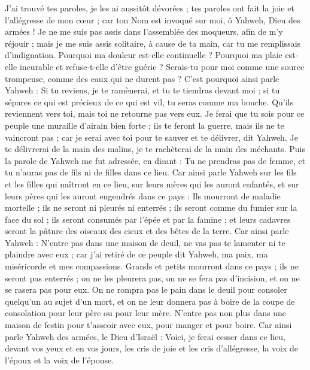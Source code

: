 \begin{multicols}{2}
J'ai trouvé tes paroles, je les ai aussitôt dévorées ; tes paroles ont fait la joie et l'allégresse de mon cœur ; car ton Nom est invoqué sur moi, ô Yahweh, Dieu des armées !
Je ne me suis pas assis dans l'assemblée des moqueurs, afin de m'y réjouir ; mais je me suis assis solitaire, à cause de ta main, car tu me remplissais d'indignation.
Pourquoi ma douleur est-elle continuelle ? Pourquoi ma plaie est-elle incurable et refuse-t-elle d'être guérie ? Serais-tu pour moi comme une source trompeuse, comme des eaux qui ne durent pas ?
C'est pourquoi ainsi parle Yahweh : Si tu reviens, je te ramènerai, et tu te tiendras devant moi ; si tu sépares ce qui est précieux de ce qui est vil, tu seras comme ma bouche. Qu'ils reviennent vers toi, mais toi ne retourne pas vers eux.
Je ferai que tu sois pour ce peuple une muraille d'airain bien forte ; ils te feront la guerre, mais ils ne te vaincront pas ; car je serai avec toi pour te sauver et te délivrer, dit Yahweh.
Je te délivrerai de la main des malins, je te rachèterai de la main des méchants.
\VerseOne{}Puis la parole de Yahweh me fut adressée, en disant :
Tu ne prendras pas de femme, et tu n'auras pas de fils ni de filles dans ce lieu.
Car ainsi parle Yahweh sur les fils et les filles qui naîtront en ce lieu, sur leurs mères qui les auront enfantés, et sur leurs pères qui les auront engendrés dans ce pays :
Ils mourront de maladie mortelle ; ils ne seront ni pleurés ni enterrés ; ils seront comme du fumier sur la face du sol ; ils seront consumés par l'épée et par la famine ; et leurs cadavres seront la pâture des oiseaux des cieux et des bêtes de la terre.
Car ainsi parle Yahweh : N'entre pas dans une maison de deuil, ne vas pas te lamenter ni te plaindre avec eux ; car j'ai retiré de ce peuple dit Yahweh, ma paix, ma miséricorde et mes compassions.
Grands et petits mourront dans ce pays ; ils ne seront pas enterrés ; on ne les pleurera pas, on ne se fera pas d'incision, et on ne se rasera pas pour eux.
On ne rompra pas le pain dans le deuil pour consoler quelqu'un au sujet d'un mort, et on ne leur donnera pas à boire de la coupe de consolation pour leur père ou pour leur mère.
N'entre pas non plus dans une maison de festin pour t'asseoir avec eux, pour manger et pour boire.
Car ainsi parle Yahweh des armées, le Dieu d'Israël : Voici, je ferai cesser dans ce lieu, devant vos yeux et en vos jours, les cris de joie et les cris d'allégresse, la voix de l'époux et la voix de l'épouse.

\end{multicols}
